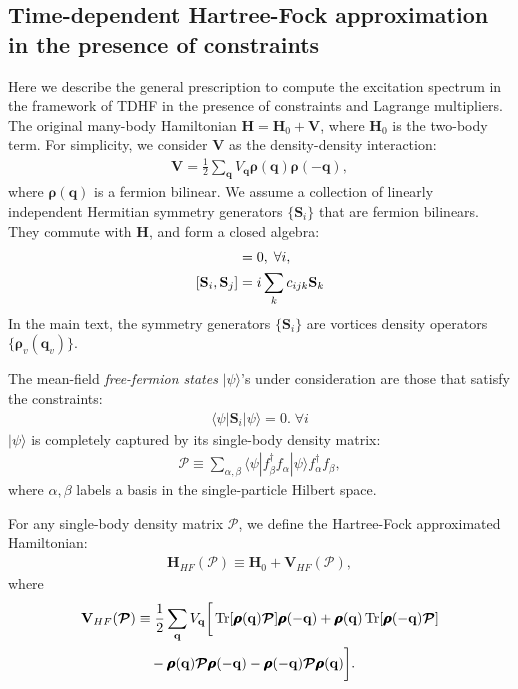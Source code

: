 \begin{subappendices}
\section{Time-dependent Hartree-Fock approximation in the presence of constraints}\label{app:TDHF}
Here we describe the general prescription to compute the excitation spectrum in the framework of TDHF in the presence of constraints and Lagrange multipliers. The original many-body Hamiltonian $\mathbf H=\mathbf H_0+\mathbf V$, where $\mathbf H_0$ is the two-body term. For simplicity, we consider $\mathbf V$ as the density-density interaction:
\begin{align}
\mathbf V=\frac{1}{2}\sum_{\mathbf q} V_{\mathbf q} \pmb{\boldsymbol\rho}(\mathbf q)\pmb{\boldsymbol\rho}(-\mathbf q),
\end{align}
where $\pmb{\boldsymbol\rho}(\mathbf q)$ is a fermion bilinear. We assume a collection of linearly independent Hermitian symmetry generators $\{\mathbf S_i\}$ that are fermion bilinears. They commute with $\mathbf H$, and form a closed algebra:
\begin{align}
[\mathbf S_i,\mathbf H]&=0,\;\forall i,\notag\\
[\mathbf S_i,\mathbf S_j]&=i\sum_{k} c_{ijk}\mathbf S_k\label{eq:S_algebra}
\end{align}
In the main text, the symmetry generators $\{\mathbf S_i\}$ are vortices density operators $\{\pmb{\boldsymbol\rho}_v(\mathbf q_v)\}$.

The mean-field \emph{free-fermion states} $|\psi\rangle$'s under consideration are those that satisfy the constraints:
\begin{align}
\langle \psi |\mathbf S_i| \psi\rangle =0.\;\forall i\label{eq:S_constraints}
\end{align}
$|\psi\rangle$ is completely captured by its single-body density matrix:
\begin{align}
\boldsymbol{\mathcal P}\equiv \sum_{\alpha,\beta}\langle \psi| f_{\beta}^\dagger f_{\alpha}|\psi\rangle f_{\alpha}^\dagger f_{\beta},
\end{align}
where $\alpha,\beta$ labels a basis in the single-particle Hilbert space.

For any single-body density matrix $\boldsymbol{\mathcal P}$, we define the Hartree-Fock approximated Hamiltonian:
\begin{align}
\mathbf H_{HF}(\boldsymbol{\mathcal P})\equiv \mathbf H_0+\mathbf V_{HF}(\boldsymbol{\mathcal P}),
\end{align}
where 
\begin{align}
\mathbf V_{HF}(\boldsymbol{\mathcal P}) &\equiv \frac{1}{2} \sum_{{\mathbf q}}V_{\mathbf q}\bigg[ \mathop{\mathrm{Tr}}[\pmb{\boldsymbol\rho}(\mathbf q)\boldsymbol{\mathcal P}]\pmb{\boldsymbol\rho}(-\mathbf q)+\pmb{\boldsymbol\rho}(\mathbf q)\mathop{\mathrm{Tr}}[\pmb{\boldsymbol\rho}(-\mathbf q)\boldsymbol{\mathcal P}]\notag\\
&\quad-\pmb{\boldsymbol\rho}(\mathbf q)\boldsymbol{\mathcal P}\pmb{\boldsymbol\rho}(-\mathbf q)-\pmb{\boldsymbol\rho}(-\mathbf q)\boldsymbol{\mathcal P}\pmb{\boldsymbol\rho}(\mathbf q) \bigg].
\end{align}


\end{subappendices}
